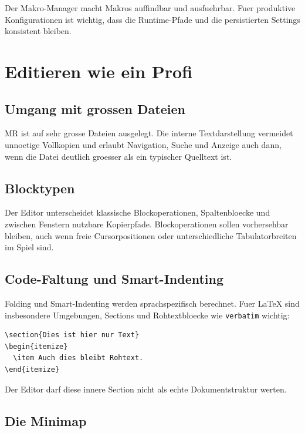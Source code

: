 \documentclass[a4paper,11pt]{report}
\newcommand{\mr}{\textsc{MR}}
\begin{document}
Der Makro-Manager macht Makros auffindbar und ausfuehrbar. Fuer produktive
Konfigurationen ist wichtig, dass die Runtime-Pfade und die persistierten
Settings konsistent bleiben.

\chapter{Editieren wie ein Profi}

\section{Umgang mit grossen Dateien}

\mr{} ist auf sehr grosse Dateien ausgelegt. Die interne Textdarstellung
vermeidet unnoetige Vollkopien und erlaubt Navigation, Suche und Anzeige auch
dann, wenn die Datei deutlich groesser als ein typischer Quelltext ist.

\section{Blocktypen}

Der Editor unterscheidet klassische Blockoperationen, Spaltenbloecke und
zwischen Fenstern nutzbare Kopierpfade. Blockoperationen sollen vorhersehbar
bleiben, auch wenn freie Cursorpositionen oder unterschiedliche Tabulatorbreiten
im Spiel sind.

\section{Code-Faltung und Smart-Indenting}

Folding und Smart-Indenting werden sprachspezifisch berechnet. Fuer LaTeX sind
insbesondere Umgebungen, Sections und Rohtextbloecke wie \texttt{verbatim}
wichtig:

\begin{verbatim}
\section{Dies ist hier nur Text}
\begin{itemize}
  \item Auch dies bleibt Rohtext.
\end{itemize}
\end{verbatim}

Der Editor darf diese innere Section nicht als echte Dokumentstruktur werten.

\section{Die Minimap}
\end{document}
